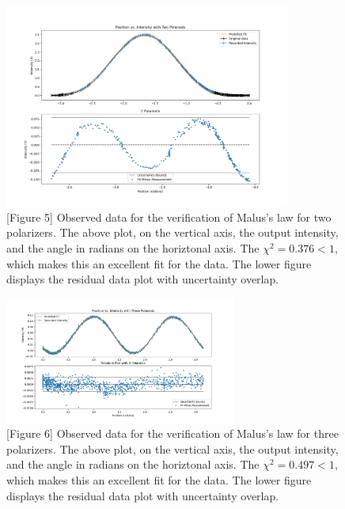 \documentclass[11pt]{article}
\begin{document}
\begin{multicols}{2}
    \begin{figure}[H]
        \hspace{-25pt} 
        \includegraphics[width=3.7in]{malus_2.png}
        \caption*{[Figure 5] Observed data for the verification of Malus's law for two polarizers. The above plot, on the vertical axis, the output intensity, and the angle in radians on the horiztonal axis. The $\chi^2 = 0.376<1$, which makes this an excellent fit for the data. The lower figure displays the residual data plot with uncertainty overlap.}
        \label{fig:malus_2}
    \end{figure}

\vspace{-20pt}

    \begin{figure}[H]
        \hspace{-5pt}
        \includegraphics[width=3in]{malus_3.png}
        \caption*{[Figure 6] Observed data for the verification of Malus's law for three polarizers. The above plot, on the vertical axis, the output intensity, and the angle in radians on the horiztonal axis. The $\chi^2 = 0.497<1$, which makes this an excellent fit for the data. The lower figure displays the residual data plot with uncertainty overlap. }
        \label{fig:malus_3}
    \end{figure}

    \vspace{-20pt}


\end{multicols}
\end{document}
